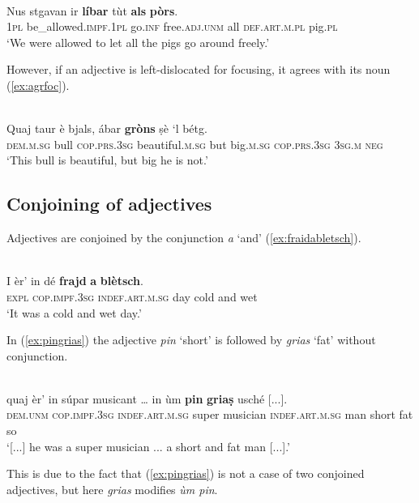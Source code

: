 \ea
\label{ex:noagr:7}
\\
\gll Nus stgavan ir \textbf{líbar} tùt \textbf{als} \textbf{pòrs}.   \\
 \textsc{1pl} be\_allowed.\textsc{impf.1pl}  go.\textsc{inf} free.\textsc{adj.unm} all  \textsc{def.art.m.pl} pig.\textsc{pl} \\
\glt `We were allowed to let all the pigs go around freely.'
\z

However, if an adjective is left-dislocated for focusing, it agrees with its noun (\ref{ex:agrfoc}).

\ea
\label{ex:agrfoc}
\\
\gll Quaj taur è bjals, ábar \textbf{gròns} ṣè `l bétg.\\
\textsc{dem.m.sg} bull \textsc{cop.prs.3sg} beautiful.\textsc{m.sg} but big.\textsc{m.sg} \textsc{cop.prs.3sg} \textsc{3sg.m} \textsc{neg}\\
\glt `This bull is beautiful, but big he is not.'
\z

\subsection{Conjoining of adjectives}
Adjectives are conjoined by the conjunction \textit{a} `and' (\ref{ex:fraidabletsch}).

\ea
\label{ex:fraidabletsch}
\\
\gll I èr' in dé \textbf{frajd} \textbf{a} \textbf{blètsch}.\\
\textsc{expl} \textsc{cop.impf.3sg} \textsc{indef.art.m.sg} day cold and wet\\
\glt `It was a cold and wet day.'
\z

In (\ref{ex:pingrias}) the adjective \textit{pin} `short' is followed by \textit{grias} `fat' without conjunction.

\ea
\label{ex:pingrias}
\\
	\gll [...] quaj èr’ in súpar musicant … in ùm \textbf{pin} \textbf{griaṣ} usché [...].\\
{} \textsc{dem.unm} \textsc{cop.impf.3sg} \textsc{indef.art.m.sg} super musician {} \textsc{indef.art.m.sg} man short fat so \\
\glt `[...] he was a super musician ... a short and fat man [...].'
\z

This is due to the fact that (\ref{ex:pingrias}) is not a case of two conjoined adjectives, but here \textit{grias} modifies \textit{ùm pin}.

